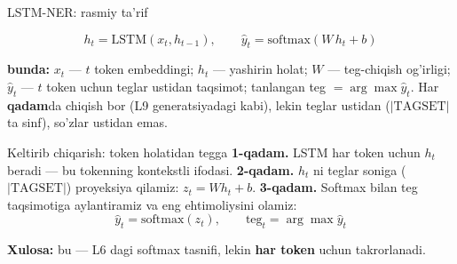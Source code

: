 \documentclass[aspectratio=169,11pt]{beamer}
\newcommand{\bunda}[1]{{\small\textbf{bunda:}\; #1}}
\begin{document}
\begin{frame}{LSTM-NER: rasmiy ta'rif}
  \begin{tcolorbox}[defbox,title=Ta'rif: har token uchun teg taqsimoti]
    \vspace{-0.4em}
    $$ h_t = \mathrm{LSTM}(x_t, h_{t-1}), \qquad
       \hat{y}_t = \mathrm{softmax}(W\,h_t + b) $$
  \end{tcolorbox}
  \vspace{2pt}
  \bunda{$x_t$ --- $t$ token embeddingi; $h_t$ --- yashirin holat; $W$ ---
  teg-chiqish og'irligi; $\hat{y}_t$ --- $t$ token uchun teglar ustidan taqsimot;
  tanlangan teg $=\arg\max \hat{y}_t$.}
  \vspace{4pt}
  \footnotesize Har \textbf{qadam}da chiqish bor (L9 generatsiyadagi kabi), lekin teglar
  ustidan ($|\text{TAGSET}|$ ta sinf), so'zlar ustidan emas.
\end{frame}

\begin{frame}{Keltirib chiqarish: token holatidan tegga}
  \textbf{1-qadam.} LSTM har token uchun $h_t$ beradi --- bu tokenning kontekstli
  ifodasi.
  \pause
  \textbf{2-qadam.} $h_t$ ni teglar soniga ($|\text{TAGSET}|$) proyeksiya qilamiz:
  $z_t = W h_t + b$.
  \pause
  \textbf{3-qadam.} Softmax bilan teg taqsimotiga aylantiramiz va eng ehtimoliysini
  olamiz:
  $$ \hat{y}_t = \mathrm{softmax}(z_t), \qquad \text{teg}_t = \arg\max \hat{y}_t $$
  \begin{tcolorbox}[okbox,top=2pt,bottom=2pt]
    \small \textbf{Xulosa:} bu --- L6 dagi softmax tasnifi, lekin \textbf{har token}
    uchun takrorlanadi.
  \end{tcolorbox}
\end{frame}
\end{document}
